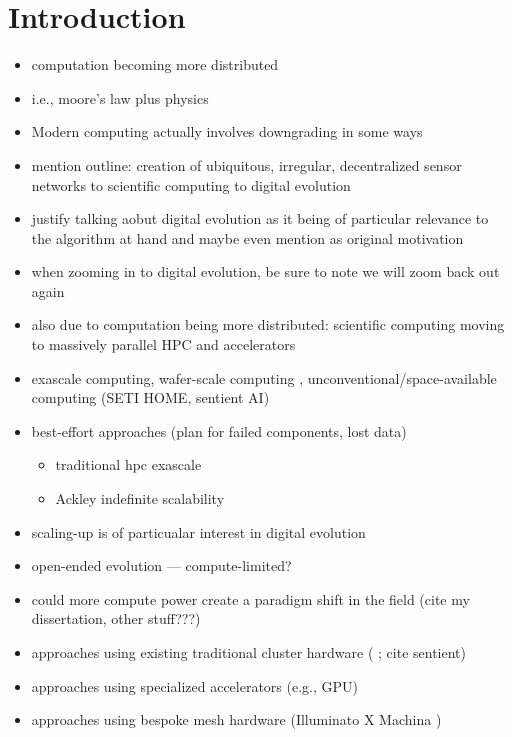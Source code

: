 \section{Introduction} \label{sec:introduction}

\begin{itemize}
  \item computation becoming more distributed
  \item i.e., moore's law plus physics \citep{sutter2005free}
  \item Modern computing actually involves downgrading in some ways
  \item mention outline: creation of ubiquitous, irregular, decentralized sensor networks to scientific computing to digital evolution
  \item justify talking aobut digital evolution as it being of particular relevance to the algorithm at hand and maybe even mention as original motivation
  \item when zooming in to digital evolution, be sure to note we will zoom back out again
\end{itemize}

\begin{itemize}
  \item also due to computation being more distributed: scientific computing moving to massively parallel HPC and accelerators
  \item exascale computing, wafer-scale computing \citep{lauterbach2021path}, unconventional/space-available computing (SETI \@ HOME, sentient AI)
  \item best-effort approaches (plan for failed components, lost data)
  \begin{itemize}
    \item traditional hpc exascale \citep{cappello2014toward}
    \item Ackley indefinite scalability \citep{ackley2011pursue}
  \end{itemize}
\end{itemize}

\begin{itemize}
  \item scaling-up is of particualar interest in digital evolution
  \item open-ended evolution --- compute-limited? \citep{channon2019maximum, taylor2016open}
  \item could more compute power create a paradigm shift in the field (cite my dissertation, other stuff???)
  \item approaches using existing traditional cluster hardware ( \citep{moreno2021conduit}; cite sentient)
  \item approaches using specialized accelerators (e.g., GPU)
  \item approaches using bespoke mesh hardware (Illuminato X Machina \citep{schulte2010genetic})
\end{itemize}

